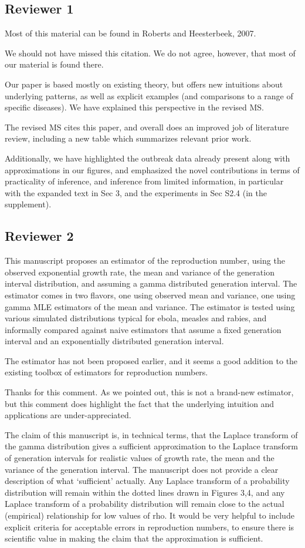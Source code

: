 \documentclass[12pt]{article}
\newcommand{\rev}{\subsection*}
\newcommand{\revtext}{\textsf}
\begin{document}
\rev{Reviewer 1}

\revtext{Most of this material can be found in Roberts and Heesterbeek, 2007.}

We should not have missed this citation. We do not agree, however, that most of our material is found there.

Our paper is based mostly on existing theory, but offers new intuitions about underlying patterns, as well as explicit examples (and comparisons to a range of specific diseases). We have explained this perspective in the revised MS.

The revised MS cites this paper, and overall does an improved job of literature review, including a new table which summarizes relevant prior work.

Additionally, we have highlighted the outbreak data already present along with approximations in our figures, and emphasized the novel contributions in terms of practicality of inference, and inference from limited information, in particular with the expanded text in Sec 3, and the experiments in Sec S2.4 (in the supplement).

\rev{Reviewer 2}

\revtext{This manuscript proposes an estimator of the reproduction number, using the observed exponential growth rate, the mean and variance of the generation interval distribution, and assuming a gamma distributed generation interval. The estimator comes in two flavors, one using observed mean and variance, one using gamma MLE estimators of the mean and variance. The estimator is tested using various simulated distributions typical for ebola, measles and rabies, and informally compared against naive estimators that assume a fixed generation interval and an exponentially distributed generation interval.}

\revtext{The estimator has not been proposed earlier, and it seems a good addition to the existing toolbox of estimators for reproduction numbers.}

Thanks for this comment. As we pointed out, this is not a brand-new estimator, but this comment does highlight the fact that the underlying intuition and applications are under-appreciated.

\revtext{The claim of this manuscript is, in technical terms, that the Laplace transform of the gamma distribution gives a sufficient approximation to the Laplace transform of generation intervals for realistic values of growth rate, the mean and the variance of the generation interval. The manuscript does not provide a clear description of what `sufficient’ actually. Any Laplace transform of a probability distribution will remain within the dotted lines drawn in Figures 3,4, and any Laplace transform of a probability distribution will remain close to the actual (empirical) relationship for low values of rho. It would be very helpful to include explicit criteria for acceptable errors in reproduction numbers, to ensure there is scientific value in making the claim that the approximation is sufficient.}
\end{document}
